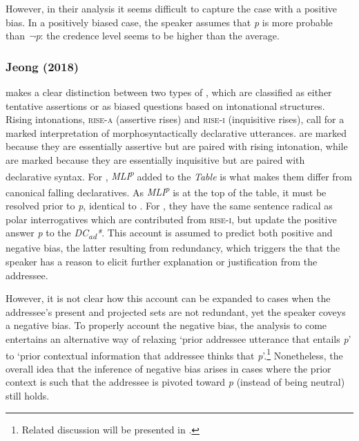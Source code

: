 \documentclass[output=paper,colorlinks,citecolor=brown]{langscibook}
\begin{document}
However, in their analysis it seems difficult to capture the case with a positive bias. In a positively biased case, the speaker assumes that \textit{p} is more probable than \textit{¬p}: the credence level seems to be higher than the average.

\subsubsection{Jeong (2018)}
\label{sec:Jeong:Hong}

\citet{jeong2018intonation} makes a clear distinction between two types of , which are classified as either tentative assertions or as biased questions based on intonational structures. Rising intonations, \textsc{rise-a} (assertive rises) and \textsc{rise-i} (inquisitive rises), call for a marked interpretation of morphosyntactically declarative utterances.  are marked because they are essentially assertive but are paired with rising intonation, while  are marked because they are essentially inquisitive but are paired with declarative syntax. For , \textit{MLI\textsuperscript{p}} added to the \textit{Table} is what makes them differ from canonical falling declaratives. As \textit{MLI\textsuperscript{p}} is at the top of the table, it must be resolved prior to \textit{p}, identical to \citet{malamud2015three}. For , they have the same sentence radical as polar interrogatives which are contributed from \textsc{rise-i}, but update the positive answer \textit{p} to the \textit{DC\textsubscript{ad}*}. This account is assumed to predict both positive and negative bias, the latter resulting from redundancy, which triggers the  that the speaker has a reason to elicit further explanation or justification from the addressee. 

However, it is not clear how this account can be expanded to cases when the addressee’s present and projected  sets are not redundant, yet the speaker coveys a negative bias. To properly account the negative bias, the analysis to come entertains an alternative way of relaxing ‘prior addressee utterance that entails \textit{p}’ to ‘prior contextual information that addressee thinks that \textit{p}’.\footnote{Related discussion will be presented in .} Nonetheless, the overall idea that the inference of negative bias arises in cases where the prior context is such that the addressee is pivoted toward \textit{p} (instead of being neutral) still holds.
\end{document}
